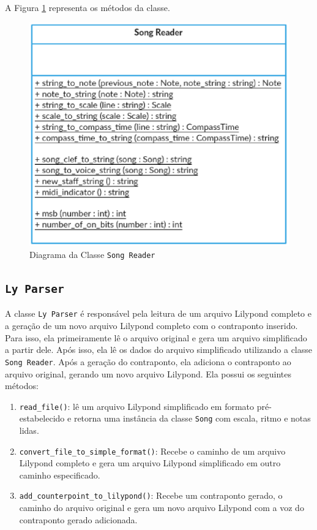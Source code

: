       A Figura \ref{songreaderclass} representa os métodos da classe.

      \begin{figure}[htb]
        \centering
        \includegraphics[scale=0.8]{figuras/songreaderclass.eps}
        \caption{Diagrama da Classe \texttt{Song Reader}}
        \label{songreaderclass}
      \end{figure}

    \subsection[\texttt{Ly Parser}]{\texttt{Ly Parser}}


      A classe \texttt{Ly Parser} é responsável pela leitura de um arquivo Lilypond completo e a geração de um novo arquivo Lilypond completo com o contraponto inserido. Para isso, ela primeiramente lê o arquivo original e gera um arquivo simplificado a partir dele. Após isso, ela lê os dados do arquivo simplificado utilizando a classe \texttt{Song Reader}. Após a geração do contraponto, ela adiciona o contraponto ao arquivo original, gerando um novo arquivo Lilypond. Ela possui os seguintes métodos:

      \begin{enumerate}
        \item \texttt{read\_file()}: lê um arquivo Lilypond simplificado em formato pré-estabelecido e retorna uma instância da classe \texttt{Song} com escala, ritmo e notas lidas.
        \item \texttt{convert\_file\_to\_simple\_format()}: Recebe o caminho de um arquivo Lilypond completo e gera um arquivo Lilypond simplificado em outro caminho especificado.
        \item \texttt{add\_counterpoint\_to\_lilypond()}: Recebe um contraponto gerado, o caminho do arquivo original e gera um novo arquivo Lilypond com a voz do contraponto gerado adicionada.
      \end{enumerate}

